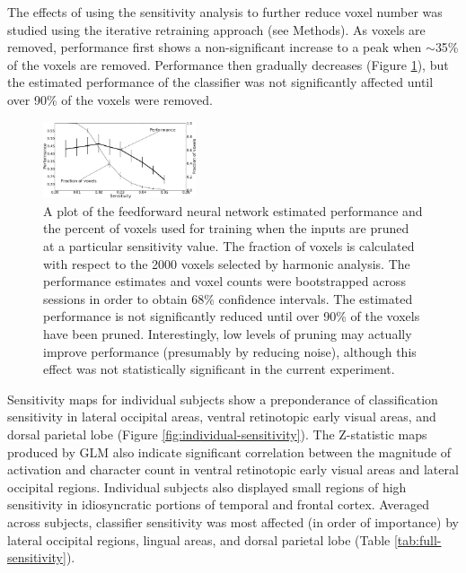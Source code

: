 \documentclass[5p,authoryear]{elsarticle}
\begin{document}
The effects of using the sensitivity analysis to further reduce voxel number was studied using the iterative retraining approach (see Methods).
As voxels are removed, performance first shows a non-significant increase to a peak when $\sim$35\% of the voxels are removed.
Performance then gradually decreases (Figure \ref{fig:sensitivity-cutoff}), but the estimated performance of the classifier was not significantly affected until over 90\% of the voxels were removed.

\begin{figure}
\centering
\includegraphics[width=0.4\textwidth]{figures/performance-verse-sensitivity-cutoff}
\caption{A plot of the feedforward neural network estimated performance and the percent of voxels used for training when the inputs are pruned at a particular sensitivity value.
The fraction of voxels is calculated with respect to the 2000 voxels selected by harmonic analysis.
The performance estimates and voxel counts were bootstrapped across sessions in order to obtain 68\% confidence intervals.
The estimated performance is not significantly reduced until over 90\% of the voxels have been pruned.
Interestingly, low levels of pruning may actually improve performance (presumably by reducing noise), although this effect was not statistically significant in the current experiment.} 
\label{fig:sensitivity-cutoff}
\end{figure}

Sensitivity maps for individual subjects show a preponderance of classification sensitivity in lateral occipital areas, ventral retinotopic early visual areas, and dorsal parietal lobe (Figure \ref{fig:individual-sensitivity}). 
The Z-statistic maps produced by GLM also indicate significant correlation between the magnitude of activation and character count in ventral retinotopic early visual areas and lateral occipital regions.
Individual subjects also displayed small regions of high sensitivity in idiosyncratic portions of temporal and frontal cortex. 
Averaged across subjects, classifier sensitivity was most affected (in order of importance) by lateral occipital regions, lingual areas, and dorsal parietal lobe (Table \ref{tab:full-sensitivity}). 
\end{document}
